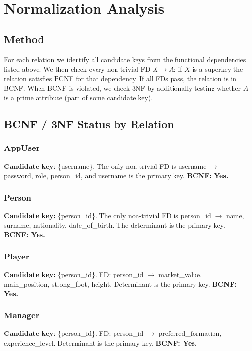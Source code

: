 \documentclass[12pt]{article}
\begin{document}
\section{Normalization Analysis}
\subsection{Method}
For each relation we identify all candidate keys from the functional dependencies listed above. We then check every non-trivial FD $X \rightarrow A$: if $X$ is a superkey the relation satisfies BCNF for that dependency. If all FDs pass, the relation is in BCNF. When BCNF is violated, we check 3NF by additionally testing whether $A$ is a prime attribute (part of some candidate key).

\subsection{BCNF / 3NF Status by Relation}

\subsubsection{AppUser}
\textbf{Candidate key:} \{username\}. The only non-trivial FD is username $\rightarrow$ password, role, person\_id, and username is the primary key. \textbf{BCNF: Yes.}

\subsubsection{Person}
\textbf{Candidate key:} \{person\_id\}. The only non-trivial FD is person\_id $\rightarrow$ name, surname, nationality, date\_of\_birth. The determinant is the primary key. \textbf{BCNF: Yes.}

\subsubsection{Player}
\textbf{Candidate key:} \{person\_id\}. FD: person\_id $\rightarrow$ market\_value, main\_position, strong\_foot, height. Determinant is the primary key. \textbf{BCNF: Yes.}

\subsubsection{Manager}
\textbf{Candidate key:} \{person\_id\}. FD: person\_id $\rightarrow$ preferred\_formation, experience\_level. Determinant is the primary key. \textbf{BCNF: Yes.}
\end{document}
